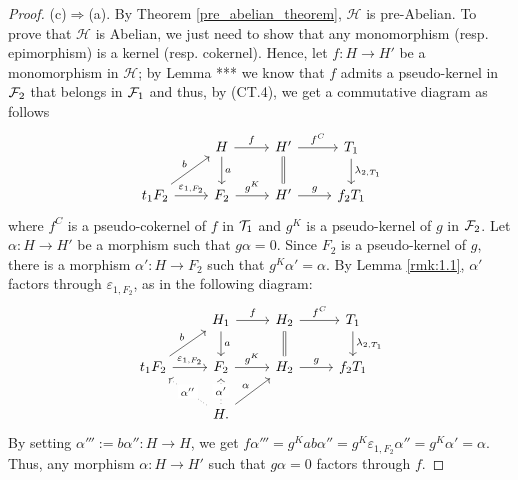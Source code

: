 \begin{proof}
\smallskip\noindent
(c)$\Rightarrow$(a). By Theorem \ref{pre_abelian_theorem}, $\mathcal{H}$ is pre-Abelian. To prove that $\mathcal{H}$ is Abelian, we just need to show that any monomorphism (resp. epimorphism) is a kernel (resp. cokernel).
Hence, let $f\colon H\to H'$ be a monomorphism in $\mathcal{H}$; by Lemma *** we know that $f$ admits a pseudo-kernel in $\mathcal F_2$ that belongs in $\mathcal F_1$ and thus, by (CT.4), we get a commutative diagram as follows
\begin{equation*}
\begin{tikzcd}
 & H\arrow{r}{f}\arrow{d}{a} & H'\arrow{r}{f^C}\arrow[equal]{d} & T_1\arrow{d}{\lambda_{2,T_1}}\\
t_1F_2\arrow{ur}{b}\arrow{r}{\varepsilon_{1,F_2}} & F_2\arrow{r}{g^K} & H'\arrow{r}{g} & f_2T_1
\end{tikzcd}
\end{equation*}
where $f^C$  is a pseudo-cokernel of $f$ in $\mathcal T_1$ and $g^K$ is a pseudo-kernel of $g$ in $\mathcal F_2$. Let $\alpha\colon H\to H'$ be a morphism such that $g\alpha =0$. Since $F_2$ is a pseudo-kernel of $g$, there is a morphism $\alpha'\colon H\to F_2$ such that $g^K\alpha'=\alpha$. By Lemma \ref{rmk:1.1}, $\alpha'$ factors through  $\varepsilon_{1,F_2}$, as in the following diagram:
\begin{equation*}
\begin{tikzcd}
& H_1\arrow{r}{f}\arrow{d}{a} & H_2\arrow{r}{f^C}\arrow[equal]{d}& T_1\arrow{d}{\lambda_{2,T_1}}\\
t_1F_2\arrow{ur}{b}\arrow{r}{\varepsilon_{1,F_2}} & F_2\arrow{r}{g^K} & H_2\arrow{r}{g} & f_2T_1\\
& H.\arrow{ur}{\alpha}\arrow[dotted]{u}[description]{\alpha'}\arrow[dotted]{ul}[description]{\alpha''} & &
\end{tikzcd}
\end{equation*}
By setting $\alpha''' := b\alpha''\colon H\to H$, we get $f\alpha''' = g^K ab\alpha'' = g^K\varepsilon_{1,F_2}\alpha''=g^K\alpha' = \alpha$. Thus, any morphism $\alpha\colon H \to H'$ such that $g\alpha =0$ factors through $f$.
\end{proof}





